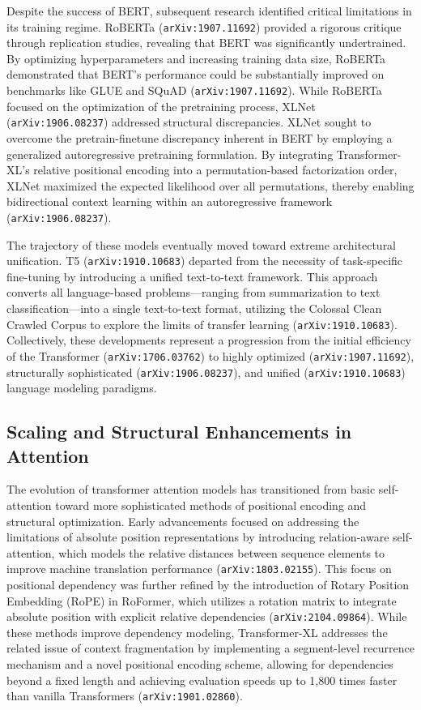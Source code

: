 \documentclass[11pt]{article}
\begin{document}
Despite the success of BERT, subsequent research identified critical limitations in its training regime. RoBERTa (\texttt{arXiv:1907.11692}) provided a rigorous critique through replication studies, revealing that BERT was significantly undertrained. By optimizing hyperparameters and increasing training data size, RoBERTa demonstrated that BERT's performance could be substantially improved on benchmarks like GLUE and SQuAD (\texttt{arXiv:1907.11692}). While RoBERTa focused on the optimization of the pretraining process, XLNet (\texttt{arXiv:1906.08237}) addressed structural discrepancies. XLNet sought to overcome the pretrain-finetune discrepancy inherent in BERT by employing a generalized autoregressive pretraining formulation. By integrating Transformer-XL's relative positional encoding into a permutation-based factorization order, XLNet maximized the expected likelihood over all permutations, thereby enabling bidirectional context learning within an autoregressive framework (\texttt{arXiv:1906.08237}).

The trajectory of these models eventually moved toward extreme architectural unification. T5 (\texttt{arXiv:1910.10683}) departed from the necessity of task-specific fine-tuning by introducing a unified text-to-text framework. This approach converts all language-based problems—ranging from summarization to text classification—into a single text-to-text format, utilizing the Colossal Clean Crawled Corpus to explore the limits of transfer learning (\texttt{arXiv:1910.10683}). Collectively, these developments represent a progression from the initial efficiency of the Transformer (\texttt{arXiv:1706.03762}) to highly optimized (\texttt{arXiv:1907.11692}), structurally sophisticated (\texttt{arXiv:1906.08237}), and unified (\texttt{arXiv:1910.10683}) language modeling paradigms.

\subsection{Scaling and Structural Enhancements in Attention}

The evolution of transformer attention models has transitioned from basic self-attention toward more sophisticated methods of positional encoding and structural optimization. Early advancements focused on addressing the limitations of absolute position representations by introducing relation-aware self-attention, which models the relative distances between sequence elements to improve machine translation performance (\texttt{arXiv:1803.02155}). This focus on positional dependency was further refined by the introduction of Rotary Position Embedding (RoPE) in RoFormer, which utilizes a rotation matrix to integrate absolute position with explicit relative dependencies (\texttt{arXiv:2104.09864}). While these methods improve dependency modeling, Transformer-XL addresses the related issue of context fragmentation by implementing a segment-level recurrence mechanism and a novel positional encoding scheme, allowing for dependencies beyond a fixed length and achieving evaluation speeds up to 1,800 times faster than vanilla Transformers (\texttt{arXiv:1901.02860}).
\end{document}
